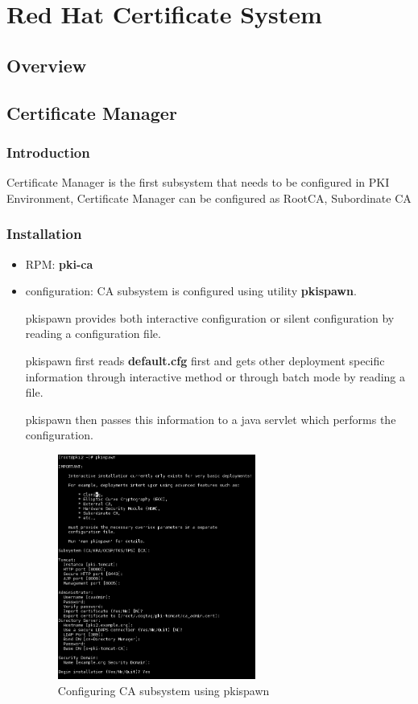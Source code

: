 \documentclass[a4paper]{article}
\begin{document}
\section{Red Hat Certificate System}
\subsection{Overview}
\subsection{Certificate Manager}
\subsubsection{Introduction}
Certificate Manager is the first subsystem that needs to be configured in PKI Environment, Certificate Manager can be configured as RootCA, Subordinate CA
\subsubsection{Installation}
    \begin{itemize}
        \item RPM: \textrm{\textbf{pki-ca}}
        \item configuration:  CA subsystem is configured using utility \textbf{pkispawn}. 
            
            pkispawn provides both interactive configuration  or silent configuration by reading a configuration file. 
            
            pkispawn first reads \textbf{default.cfg} first and gets other deployment specific information through interactive method
            or through batch mode by reading a file. 

            pkispawn then passes this information to a java servlet which performs the configuration. 
        \begin{figure}[ht!]
            \centering
            \includegraphics[width=65mm]{pkispawn-ca.png}
            \caption{Configuring CA subsystem using pkispawn}
        \end{figure}
    \end{itemize}
\end{document}
